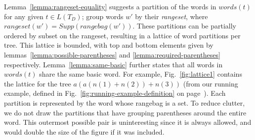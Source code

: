 \documentclass[acmsmall,review,anonymous]{acmart}\settopmatter{printfolios=true,printccs=false,printacmref=false}
\newcommand{\support}{\mathit{Supp}}
\newcommand{\words}{\mathit{words}} %
\newcommand{\alt}{\mathit{alt}} %
\newcommand{\rangebag}{\mathit{rangebag}} %
\newcommand{\rangeset}{\mathit{rangeset}} %
\begin{document}
Lemma~\ref{lemma:rangeset-equality} suggests a partition of the words in $\words(t)$ for any given $t \in L(T_D)$; group words $w'$ by their \emph{rangeset}, where $\rangeset(w') = \support(\rangebag(w'))$. These partitions can be partially ordered by subset on the rangeset, resulting in a lattice of word partitions per tree. This lattice is bounded, with top and bottom elements given by lemmas~\ref{lemma:possible-parentheses} and \ref{lemma:required-parentheses} respectively. Lemma~\ref{lemma:same-basic} further states that all words in $\words(t)$ share the same basic word. For example, Fig.~\ref{fig:lattice1} contains the lattice for the tree $a(a(n(1)+n(2))+n(3))$ (from our running example, defined in Fig.~\ref{fig:running-example-definition} on page~\pageref{fig:running-example-definition}). Each partition is represented by the word whose rangebag is a set. To reduce clutter, we do not draw the partitions that have grouping parentheses around the entire word. This outermost possible pair is uninteresting since it is always allowed, and would double the size of the figure if it was included.
\end{document}

